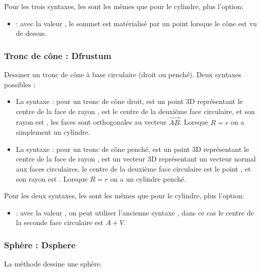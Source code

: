 Pour les trois syntaxes, les  sont les mêmes que pour le cylindre, plus l'option:
\begin{itemize}    
    \item {} : avec la valeur \true, le sommet est matérialisé par un point lorsque le cône est vu de dessus.
\end{itemize}

\subsubsection{Tronc de cône : Dfrustum}

Dessiner un tronc de cône à base circulaire (droit ou penché). Deux syntaxes possibles :

\begin{itemize}
    \item La syntaxe :  pour un tronc de cône droit,  est un point 3D représentant le centre de la face de rayon ,  est le centre de la deuxième face circulaire, et son rayon est , les faces sont orthogonales au vecteur $\vec{AB}$. Lorsque $R=r$ on a simplement un cylindre.
    
    \item La syntaxe :  pour un tronc de cône penché,  est un point 3D représentant le centre de la face de rayon ,  est un vecteur 3D représentant un vecteur normal aux faces circulaires, le centre de la deuxième face circulaire est le point , et son rayon est . Lorsque $R=r$ on a un cylindre penché.
\end{itemize}

Pour les deux syntaxes, les  sont les mêmes que pour le cylindre, plus l'option:
\begin{itemize}    
    \item {} : avec la valeur \true, on peut utiliser l'ancienne syntaxe  , dans ce cas le centre de la seconde face circulaire est $A+V$.
\end{itemize}

\subsubsection{Sphère : Dsphere}

La méthode  dessine une sphère.

